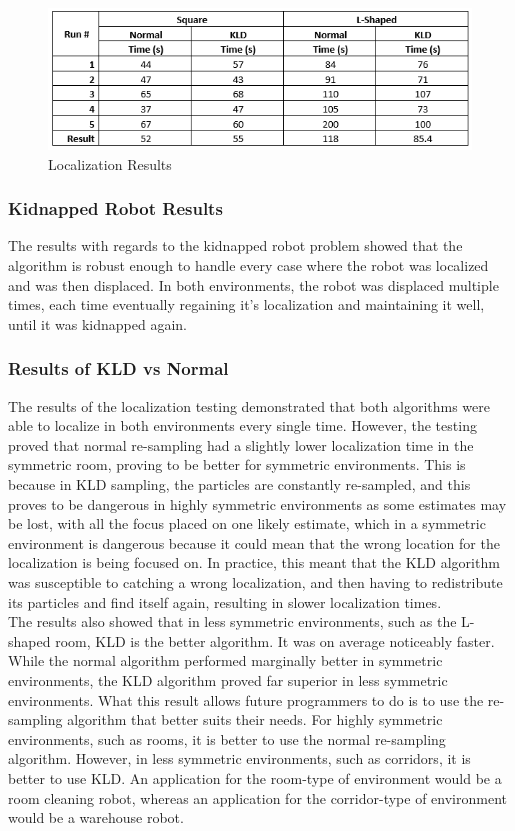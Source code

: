 \documentclass{article}
\newcommand\tab[1][0.5cm]{\hspace*{#1}}
\begin{document}
\begin{figure}[h!]
\centering
\includegraphics[scale=1.0]{Localization_Results.PNG}
\caption{Localization Results}
\label{fig:localization_times}
\end{figure}

\subsubsection{Kidnapped Robot Results}
\tab The results with regards to the kidnapped robot problem showed that the algorithm is robust enough to handle every case where the robot was localized and was then displaced. In both environments, the robot was displaced multiple times, each time eventually regaining it's localization and maintaining it well, until it was kidnapped again.

\subsubsection{Results of KLD vs Normal}
\tab The results of the localization testing demonstrated that both algorithms were able to localize in both environments every single time. However, the testing proved that normal re-sampling had a slightly lower localization time in the symmetric room, proving to be better for symmetric environments. This is because in KLD sampling, the particles are constantly re-sampled, and this proves to be dangerous in highly symmetric environments as  some estimates may be lost, with all the focus placed on one likely estimate, which in a symmetric environment is dangerous because it could mean that the wrong location for the localization is being focused on. In practice, this meant that the KLD algorithm was susceptible to catching a wrong localization, and then having to redistribute its particles and find itself again, resulting in slower localization times.\\

The results also showed that in less symmetric environments, such as the L-shaped room, KLD is the better algorithm. It was on average noticeably faster. While the normal algorithm performed marginally better in symmetric environments, the KLD algorithm proved far superior in less symmetric environments. What this result allows future programmers to do is to use the re-sampling algorithm that better suits their needs. For highly symmetric environments, such as rooms, it is better to use the normal re-sampling algorithm. However, in less symmetric environments, such as corridors, it is better to use KLD. An application for the room-type of environment would be a room cleaning robot, whereas an application for the corridor-type of environment would be a warehouse robot.\\
\end{document}
